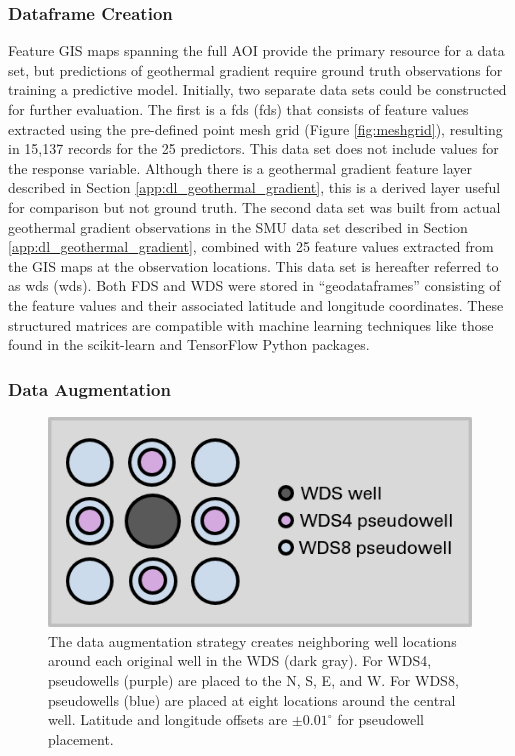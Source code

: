 \subsubsection{Dataframe Creation}
Feature GIS maps spanning the full AOI provide the primary resource for a data set, but predictions of geothermal gradient require ground truth observations for training a predictive model. Initially, two separate data sets could be constructed for further evaluation. The first is a \acrlong{fds} (\acrshort{fds}) that consists of feature values extracted using the pre-defined point mesh grid (Figure \ref{fig:meshgrid}), resulting in 15,137 records for the 25 predictors. This data set does not include values for the response variable. Although there is a geothermal gradient feature layer described in Section \ref{app:dl_geothermal_gradient}, this is a derived layer useful for comparison but not ground truth. The second data set was built from actual geothermal gradient observations in the SMU data set described in Section \ref{app:dl_geothermal_gradient}, combined with 25 feature values extracted from the GIS maps at the observation locations. This data set is hereafter referred to as \acrlong{wds} (\acrshort{wds}). Both FDS and WDS were stored in ``geodataframes'' consisting of the feature values and their associated latitude and longitude coordinates. These structured matrices are compatible with machine learning techniques like those found in the scikit-learn \citep{pedregosa_scikit-learn_2011} and TensorFlow \citep{abadi_tensorflow_2016} Python packages. 

\subsubsection{Data Augmentation}
\label{ch3:augmentation}

\begin{figure}
\centering
\includegraphics[scale=0.9]{templates/images/Figure-AugmentedWells.png}
\singlespacing
\caption[Data augmentation strategy]{The data augmentation strategy creates neighboring well locations around each original well in the WDS (dark gray). For WDS4, pseudowells (purple) are placed to the N, S, E, and W. For WDS8, pseudowells (blue) are placed at eight locations around the central well. Latitude and longitude offsets are $\pm0.01^\circ$ for pseudowell placement.}
\label{fig:data_augmentation}
\end{figure}

